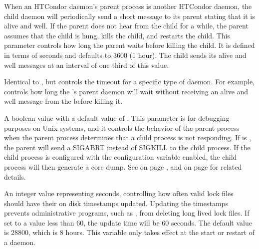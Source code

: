 \begin{description}
\label{param:NotRespondingTimeout}
\item[\Macro{NOT\_RESPONDING\_TIMEOUT}]
  When an HTCondor daemon's parent process is another HTCondor daemon, 
  the child daemon will
  periodically send a short message to its parent stating that it is alive
  and well. If the parent does not hear from the child for a while,
  the parent assumes that the child is hung,
  kills the child, and restarts the child. This parameter
  controls how long the parent waits before killing the child. It is defined
  in terms of seconds and defaults to 3600 (1 hour). The child sends its
  alive and well messages at an interval of one third of this value.

\label{param:SubsysNotRespondingTimeout}
\item[\MacroB{<SUBSYS>\_NOT\_RESPONDING\_TIMEOUT}]
  Identical to , but controls the timeout
  for a specific type of daemon. For example,
   controls how long the
  's parent daemon will wait without receiving an 
  alive and well
  message from the  before killing it.

\label{param:NotRespondingWantCore}
\item[\Macro{NOT\_RESPONDING\_WANT\_CORE}]
  A boolean value with a default value of .
  This parameter is for debugging purposes on Unix systems, and it
  controls the behavior of the parent process when the parent process
  determines that a child process is not responding.
  If  is , the parent 
  will send a SIGABRT instead of SIGKILL to the child process.
  If the child process is configured with the configuration variable
   enabled, the child process will then
  generate a core dump.
  See  on page
  \pageref{param:NotRespondingTimeout}, and 
   on page
  \pageref{param:CreateCoreFiles} for related details.

\label{param:LockFileUpdateInterval}
\item[\Macro{LOCK\_FILE\_UPDATE\_INTERVAL}]
  An integer value representing seconds,
  controlling how often valid lock files should have their on disk
  timestamps updated. Updating the timestamps prevents administrative programs,
  such as , from deleting long lived lock files.
  If set to a value less than 60, the update time will be 60 seconds.
  The default value is 28800, which is 8 hours. 
  This variable only takes effect at the start or restart of a daemon.


\end{description}
